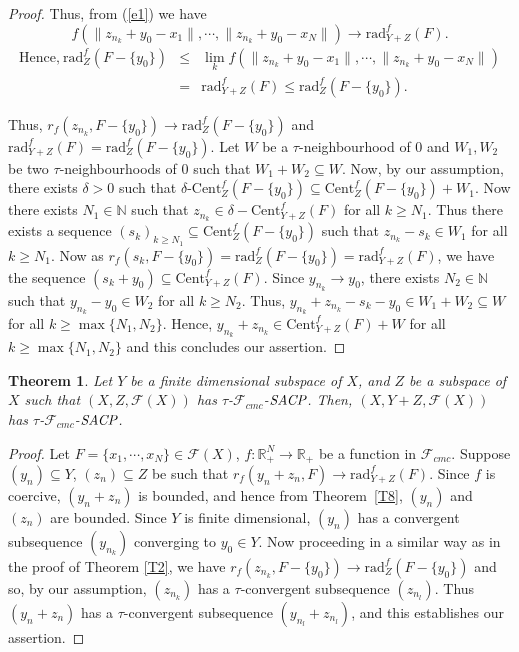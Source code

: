 \documentclass[11pt]{amsart}
\newtheorem{thm}{Theorem}[section]
\newcommand{\ra}{\rightarrow}
\newcommand{\ci}{\subseteq}
\newcommand{\de}{\delta}
\newcommand{\mb}{\mathbb}
\newcommand{\mc}{\mathcal}
\newcommand{\mr}{\mathscr}
\newcommand{\trC}{\textrm{Cent}}
\newcommand{\trr}{\textrm{rad}}
\newcommand{\eSACP}{\bf{\emph{SACP}}}
\newcommand{\beqa}{\begin{eqnarray*}}
\newcommand{\eeqa}{\end{eqnarray*}}
\begin{document}
\begin{proof}
Thus, from (\ref{e1}) we have 
\[f(\|z_{n_k}+y_0-x_1\|,\cdots,\|z_{n_k}+y_0-x_N\|)\ra\trr_{Y+Z}^f(F).\]
\beqa\mbox{Hence,}~
\trr_Z^f(F-\{y_0\})
&\leq &\lim_k f(\|z_{n_k}+y_0-x_1\|,\cdots,\|z_{n_k}+y_0-x_N\|)\\
&=&\trr_{Y+Z}^f(F)\leq\trr_Z^f(F-\{y_0\}).
\eeqa

Thus, $r_f(z_{n_k},F-\{y_0\})\ra\trr_Z^f(F-\{y_0\})$ and $\trr_{Y+Z}^f(F)=\trr_Z^f(F-\{y_0\})$. Let $W$ be a $\tau$-neighbourhood of 0 and $W_1,W_2$ be two $\tau$-neighbourhoods of 0 such that $W_1+W_2\ci W$. Now, by our assumption, there exists $\de>0$ such that $\de$-$\trC_Z^f(F-\{y_0\})\ci\trC_Z^f(F-\{y_0\})+W_1$. Now there exists $N_1\in\mb{N}$ such that $z_{n_k}\in\de-\trC_{Y+Z}^f(F)$ for all $k\geq N_1$. Thus there exists a sequence $(s_k)_{k\geq N_1}\ci\trC_Z^f(F-\{y_0\})$ such that $z_{n_k}-s_k\in W_1$ for all $k\geq N_1$. Now as $r_f(s_k,F-\{y_0\})=\trr_Z^f(F-\{y_0\})=\trr_{Y+Z}^f(F)$, we have the sequence $(s_k+y_0)\ci\trC_{Y+Z}^f(F)$. Since $y_{n_k}\ra y_0$, there exists $N_2\in\mb{N}$ such that $y_{n_k}-y_0\in W_2$ for all $k\geq N_2$. Thus, $y_{n_k}+z_{n_k}-s_k-y_0\in W_1+W_2\ci W$ for all $k\geq \max\{N_1,N_2\}$.  Hence, $y_{n_k}+z_{n_k}\in\trC_{Y+Z}^f(F)+W$ for all $k\geq\max\{N_1,N_2\}$ and this concludes our assertion.
\end{proof}
\begin{thm}\label{T1}
Let $Y$ be a finite dimensional subspace of $X$, and $Z$ be a subspace of $X$ such that $(X,Z,\mc{F}(X))$ has $\tau$-$\mr{F}_{cmc}$-$\eSACP$. Then, $(X,Y+Z,\mc{F}(X))$ has $\tau$-$\mr{F}_{cmc}$-$\eSACP$. 
\end{thm}

\begin{proof}
Let $F=\{x_1,\cdots,x_N\}\in\mc{F}(X)$, $f:\mb{R}^N_+\ra\mb{R}_+$ be a function in $\mr{F}_{cmc}$. Suppose $(y_n)\ci Y$, $(z_n)\ci Z$ be such that $r_f(y_n+z_n,F)\ra\trr_{Y+Z}^f(F)$. Since $f$ is coercive, $(y_n+z_n)$ is bounded, and hence from Theorem~\ref{T8}, $(y_n)$ and $(z_n)$ are bounded. Since $Y$ is finite dimensional, $(y_n)$ has a convergent subsequence $(y_{n_k})$ converging to $y_0\in Y$. Now proceeding in a similar way as in the proof of Theorem \ref{T2}, we have $r_f(z_{n_k},F-\{y_0\})\ra\trr_Z^f(F-\{y_0\})$ and so, by our assumption, $(z_{n_k})$ has a $\tau$-convergent subsequence $(z_{n_l})$. Thus $(y_n+z_n)$ has a $\tau$-convergent subsequence $(y_{n_l}+z_{n_l})$, and this establishes our assertion. 
\end{proof}
\end{document}
